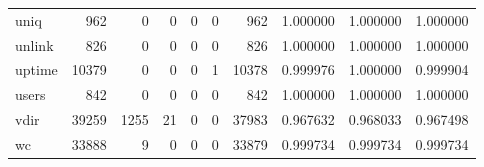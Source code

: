 \begin{longtable}{lrrrrrrrrr}
uniq      &                                 962 &                                               0 &                                              0 &                                             0 &                                              0 &                                          962 &                                           1.000000 &                               1.000000 &                             1.000000 \\
unlink    &                                 826 &                                               0 &                                              0 &                                             0 &                                              0 &                                          826 &                                           1.000000 &                               1.000000 &                             1.000000 \\
uptime    &                               10379 &                                               0 &                                              0 &                                             0 &                                              1 &                                        10378 &                                           0.999976 &                               1.000000 &                             0.999904 \\
users     &                                 842 &                                               0 &                                              0 &                                             0 &                                              0 &                                          842 &                                           1.000000 &                               1.000000 &                             1.000000 \\
vdir      &                               39259 &                                            1255 &                                             21 &                                             0 &                                              0 &                                        37983 &                                           0.967632 &                               0.968033 &                             0.967498 \\
wc        &                               33888 &                                               9 &                                              0 &                                             0 &                                              0 &                                        33879 &                                           0.999734 &                               0.999734 &                             0.999734 \\

\end{longtable}
